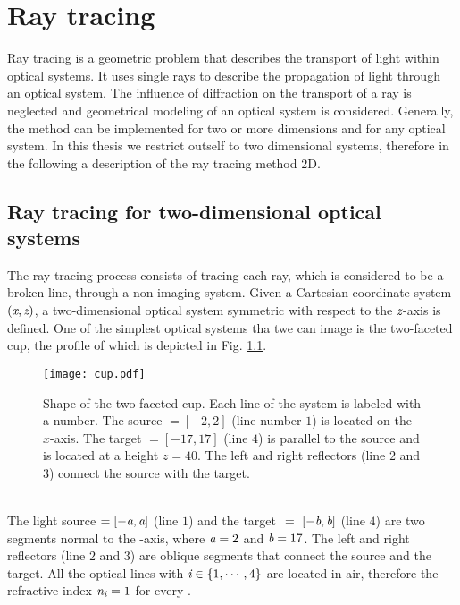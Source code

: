 \chapter{Ray tracing}\label{chap:raytracing}
Ray tracing is a geometric problem that describes the transport of light within optical systems.
It uses single rays to describe the propagation of light through an optical system.
The influence of diffraction on the transport of a ray is neglected and geometrical modeling of an optical system is considered.
Generally, the method can be implemented for two or more dimensions and for any optical system.
In this thesis we restrict outself to two dimensional systems, therefore in the following a description of the ray tracing method  $2$D.
\section{Ray tracing for two-dimensional optical systems}
The ray tracing process consists of tracing each ray, which is considered to be a broken line, through a non-imaging system.
Given a Cartesian coordinate system $(\textit{x}, \textit{z})$, a two-dimensional optical system symmetric with respect to the $\textit{z}$-axis is defined.
One of the simplest optical systems tha twe can image is the two-faceted cup, the profile of which is depicted in Fig. \ref{figure:cup}.
\begin{figure}[h]
\label{figure:cup}
  \begin{center}
  \texttt{[image: cup.pdf]}
  \end{center}
  \caption{\footnotesize{Shape of the two-faceted cup.  Each line of the system is labeled with a number.
   The source $= [-2,2]$ (line number $1$) is located on the $x$-axis.
   The target $= [-17, 17]$ (line $4$) is parallel to the source and is located at a height $ z= 40$.
   The left and right reflectors (line $2$ and $3$) connect the source with the target.}}
  \label{figure:cup}
\end{figure}
\\ \indent The light source $= [-\textit{a}, \textit{a}]$ (line $1$) and the target $~=~ [-\textit{b}, \textit{b}]$ (line $4$) are two segments normal to the -axis, where $\textit{a}=2$ and $\textit{b}=17$.
The left and right reflectors (line $2$ and $3$) are oblique segments that connect the source and the target.
All the optical lines  with $\textit{i} \in \{1, \cdots, 4\}$ are located in air, therefore the refractive index $\textit{n}_{\textit{i}}=1$ for every .
